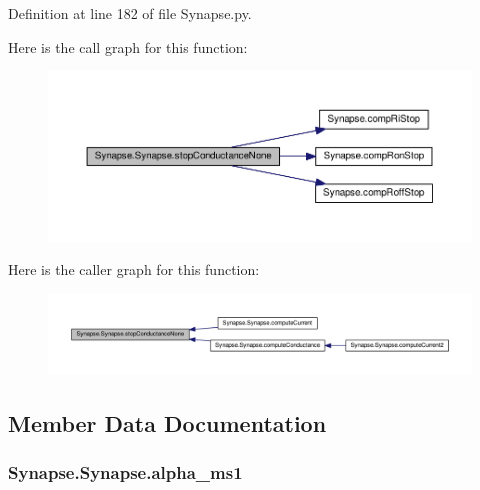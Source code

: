 Definition at line 182 of file Synapse.\-py.



Here is the call graph for this function\-:\nopagebreak
\begin{figure}[H]
\begin{center}
\leavevmode
\includegraphics[width=350pt]{class_synapse_1_1_synapse_aa8deb85e48c1a9b27453e0ebde27b2cf_cgraph}
\end{center}
\end{figure}




Here is the caller graph for this function\-:\nopagebreak
\begin{figure}[H]
\begin{center}
\leavevmode
\includegraphics[width=350pt]{class_synapse_1_1_synapse_aa8deb85e48c1a9b27453e0ebde27b2cf_icgraph}
\end{center}
\end{figure}




\subsection{Member Data Documentation}
\hypertarget{class_synapse_1_1_synapse_ae15502cd5d5604d38328b2b1432477d7}{
\subsubsection[{alpha\-\_\-ms1}]{\setlength{\rightskip}{0pt plus 5cm}Synapse.\-Synapse.\-alpha\-\_\-ms1}}\label{class_synapse_1_1_synapse_ae15502cd5d5604d38328b2b1432477d7}


